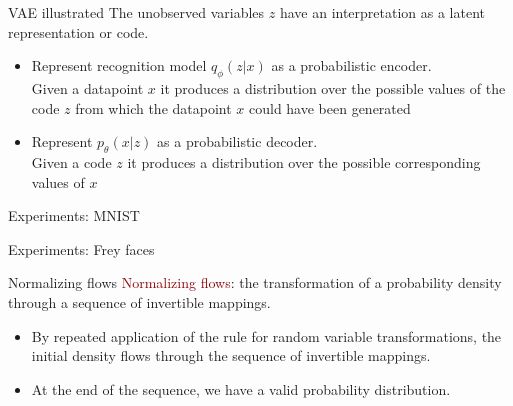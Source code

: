 \documentclass[unicode,11pt]{beamer}
\begin{document}
\begin{frame}{VAE illustrated}
  The unobserved variables $z$ have an interpretation as a latent representation or code.

  \begin{itemize}
    \item Represent recognition model $q_{\phi}(z|x)$ as a probabilistic encoder.\\
        Given a datapoint $x$ it produces a distribution over the possible values of the code $z$
        from which the datapoint $x$ could have been generated
    \item Represent $p_{\theta}(x|z)$ as a probabilistic decoder.\\
        Given a code $z$ it produces a distribution over the possible corresponding values of $x$
  \end{itemize}
\end{frame}


\begin{frame}{Experiments: MNIST}
\end{frame}


\begin{frame}{Experiments: Frey faces}
\end{frame}


\begin{frame}
  \centering\fontsize{24pt}{1em}\color{darkred}{\selectfont{What is wrong with VAE?}}
\end{frame}


\begin{frame}[fragile]{Normalizing flows}
  \textcolor{darkred}{Normalizing flows}: the transformation of a probability density through
  a sequence of invertible mappings.
  \begin{itemize}
    \item By repeated application of the rule for random variable transformations, the initial
    density flows through the sequence of invertible mappings.
    \item At the end of the sequence, we have a valid probability distribution.
  \end{itemize}

\end{frame}
\end{document}
